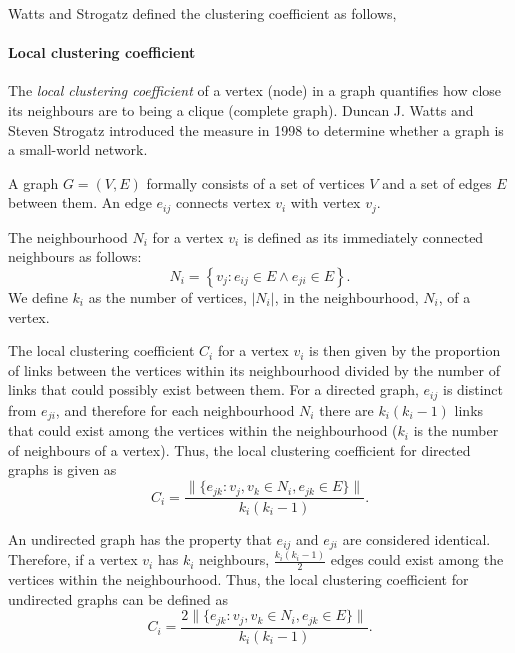        Watts and Strogatz defined the clustering coefficient as follows, 
              
      \paragraph{Local clustering coefficient}
              
        The \emph{local clustering coefficient} of a vertex (node) in a graph quantifies how close its neighbours are to being a clique (complete graph). Duncan J. Watts and Steven Strogatz introduced the measure in 1998 to determine whether a graph is a small-world network.
              
        A graph $G=(V,E)$ formally consists of a set of vertices $V$ and a set of edges $E$ between them. An edge $e_{ij}$ connects vertex $v_i$ with vertex $v_j$.

        The neighbourhood $N_i$ for a vertex $v_i$ is defined as its immediately connected neighbours as follows:
        \begin{equation}
          N_i = \left\{v_j: e_{ij} \in E \wedge e_{ji} \in E\right\} \mbox{.}
        \end{equation}
        We define $k_i$ as the number of vertices, $|N_i|$, in the neighbourhood, $N_i$, of a vertex.

        The local clustering coefficient $C_i$ for a vertex $v_i$ is then given by the proportion of links between the vertices within its neighbourhood divided by the number of links that could possibly exist between them. For a directed graph, $e_{ij}$ is distinct from $e_{ji}$, and therefore for each neighbourhood $N_i$ there are $k_i(k_i-1)$ links that could exist among the vertices within the neighbourhood ($k_i$ is the number of neighbours of a vertex). Thus, the local clustering coefficient for directed graphs is given as\cite{WattsStrogatz1998}
        \begin{equation}
          C_i = \frac{\|\{e_{jk}: v_j,v_k \in N_i, e_{jk} \in E\}\|}{k_i(k_i-1)} \mbox{.}
        \end{equation}
    
        An undirected graph has the property that $e_{ij}$ and $e_{ji}$ are considered identical. Therefore, if a vertex $v_i$ has $k_i$ neighbours, $\frac{k_i(k_i-1)}{2}$ edges could exist among the vertices within the neighbourhood. Thus, the local clustering coefficient for undirected graphs can be defined as
        \begin{equation}
          C_i = \frac{2\|\{e_{jk}: v_j,v_k \in N_i, e_{jk} \in E\}\|}{k_i(k_i-1)} \mbox{.}
        \end{equation}

